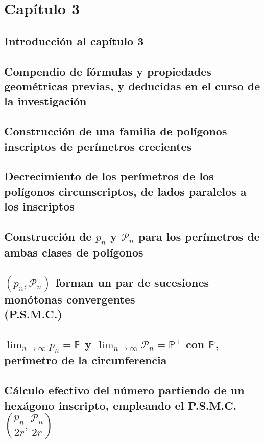 \documentclass[12pt]{article}
\begin{document}
\section{Capítulo 3}
\subsection{Introducción al capítulo 3}
\subsection{
  Compendio de fórmulas y propiedades geométricas previas, y deducidas en el curso de la investigación
}
\lipsum[2]

\subsection{
  Construcción de una familia de polígonos inscriptos de perímetros crecientes
}
\lipsum[2]

\subsection{
  Decrecimiento de los perímetros de los polígonos circunscriptos, de lados paralelos a los inscriptos
}
\lipsum[2]

\subsection{
  Construcción de ${p}_n$ y ${\mathcal{P}}_n$ para los perímetros de ambas clases de polígonos
}
\lipsum[2]

\subsection{
  $({p}_n, {\mathcal{P}}_n)$ forman un par de sucesiones monótonas convergentes \\ (P.S.M.C.)
}
\lipsum[2]

\subsection{
$\lim_{n \to \infty} {p}_n = \mathbb{P}$ y $\lim_{n \to \infty} {\mathcal{P}}_n = {\mathbb{P}}^{+}$ con $\mathbb{P}$, perímetro de la circunfe\-rencia
}
\lipsum[2]


\subsection{
  Cálculo efectivo del número \text{\Large $\pi$} partiendo de un hexágono inscripto, empleando el P.S.M.C. $\left(\dfrac{{p}_n}{2r},\dfrac{{\mathcal{P}}_n}{2r}\right)$
}
\lipsum[2]
\end{document}
